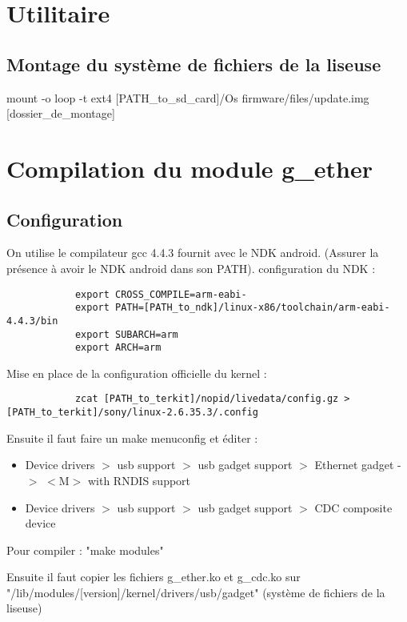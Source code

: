 \section {Utilitaire}
\subsection{Montage du système de fichiers de la liseuse}
	mount -o loop -t ext4 [PATH_to_sd_card]/Os firmware/files/update.img  [dossier_de_montage]


\section{Compilation du module g_ether}
	\subsection{Configuration}
		On utilise le compilateur gcc 4.4.3 fournit avec le NDK android.
		(Assurer la présence à avoir le NDK android dans son PATH).
		configuration du NDK : 
		\begin{verbatim}
			export CROSS_COMPILE=arm-eabi-
			export PATH=[PATH_to_ndk]/linux-x86/toolchain/arm-eabi-4.4.3/bin
			export SUBARCH=arm
			export ARCH=arm
		\end{verbatim}
		Mise en place de la configuration officielle du kernel : 
		\begin{verbatim}
			zcat [PATH_to_terkit]/nopid/livedata/config.gz >[PATH_to_terkit]/sony/linux-2.6.35.3/.config
		\end{verbatim}
		Ensuite il faut faire un make menuconfig et éditer  : 
			\begin{itemize}
				\item  Device drivers $>$ usb support $>$ usb gadget support $>$ Ethernet gadget -$>$ $<$M$>$ with RNDIS support
				\item Device drivers $>$ usb support $>$ usb gadget support $>$ CDC composite device
			\end{itemize}

Pour compiler : "make modules"
		
		Ensuite il faut copier les fichiers g_ether.ko et g_cdc.ko sur "/lib/modules/[version]/kernel/drivers/usb/gadget" (système de fichiers de la liseuse)
	
